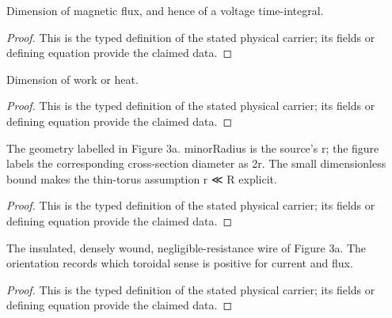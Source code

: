 \begin{definition}
  \label{def:physics:IPhO_2026_3_A_2:aux007}
  Dimension of magnetic flux, and hence of a voltage time-integral.
\end{definition}
\begin{proof}
  This is the typed definition of the stated physical carrier; its fields or defining equation provide the claimed data.
\end{proof}

\begin{definition}
  \label{def:physics:IPhO_2026_3_A_2:aux008}
  Dimension of work or heat.
\end{definition}
\begin{proof}
  This is the typed definition of the stated physical carrier; its fields or defining equation provide the claimed data.
\end{proof}

\begin{definition}
  \label{def:physics:IPhO_2026_3_A_2:aux009}
  The geometry labelled in Figure 3a. minorRadius is the source's r; the figure labels the corresponding cross-section diameter as 2r. The small dimensionless bound makes the thin-torus assumption r ≪ R explicit.
\end{definition}
\begin{proof}
  This is the typed definition of the stated physical carrier; its fields or defining equation provide the claimed data.
\end{proof}

\begin{definition}
  \label{def:physics:IPhO_2026_3_A_2:aux010}
  The insulated, densely wound, negligible-resistance wire of Figure 3a. The orientation records which toroidal sense is positive for current and flux.
\end{definition}
\begin{proof}
  This is the typed definition of the stated physical carrier; its fields or defining equation provide the claimed data.
\end{proof}

